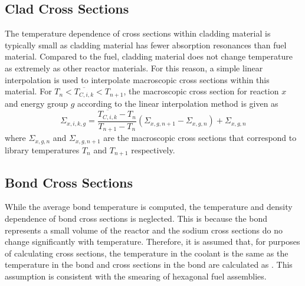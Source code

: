   \subsection{Clad Cross Sections}
    The temperature dependence of cross sections within cladding material is
    typically small as cladding material has fewer absorption resonances than
    fuel material. Compared to the fuel, cladding material does not change
    temperature as extremely as other reactor materials. For this reason, a
    simple linear interpolation is used to interpolate macroscopic cross
    sections within this material. For $T_n < \overline{T_{C,i,k}} < T_{n+1}$,
    the macroscopic cross section for reaction $x$ and energy group $g$
    according to the linear interpolation method is given as
    \begin{equation}
      \label{eq:xs_linear_interpolation}
      \Sigma_{x,i,k,g} = 
        \frac{\overline{T_{C,i,k}} - T_{n}}{T_{n+1}-T_{n}} 
        (\Sigma_{x,g,n+1} - \Sigma_{x,g,n})  + \Sigma_{x,g,n}
    \end{equation}
    where $\Sigma_{x,g,n}$ and $\Sigma_{x,g,n+1}$ are the macroscopic
    cross sections that correspond to library temperatures $T_n$ and $T_{n+1}$
    respectively. 

  \subsection{Bond Cross Sections}
    While the average bond temperature is computed, the temperature and density
    dependence of bond cross sections is neglected. This is because the bond 
    represents a small volume of the reactor and the sodium cross sections 
    do no change significantly with temperature. Therefore, it is assumed that,
    for purposes of calculating cross sections, the temperature in the coolant
    is the same as the temperature in the bond and cross sections in the bond
    are calculated as . This assumption is consistent with the
    smearing of hexagonal fuel assemblies.

